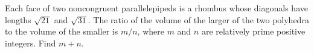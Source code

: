 \documentclass[11pt]{article}
\theoremstyle{definition}
\begin{document}
%	










\begin{question}[name={2023 AIME I, \href{https://artofproblemsolving.com/community/c4p27048975}{Problem 13}}]
	Each face of two noncongruent parallelepipeds is a rhombus whose diagonals have lengths $\sqrt{21}$ and $\sqrt{31}$. The ratio of the volume of the larger of the two polyhedra to the volume of the smaller is $m/n$, where $m$ and $n$ are relatively prime positive integers. Find $m+n$. 
\end{question}
\end{document}

